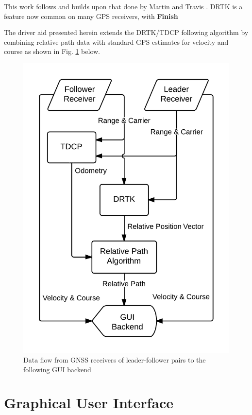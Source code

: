 \documentclass[twocolumn,10pt]{article}
\begin{document}
  This work follows and builds upon that done by Martin \cite{ScottThesis} and Travis \cite{travisdiss}.
  DRTK is a feature now common on many GPS receivers, with \textbf{Finish}
  
  The driver aid presented herein extends the DRTK/TDCP following algorithm by combining relative path data with standard GPS estimates for velocity and course as shown in Fig. \ref{fig:data_flow} below.

  \begin{figure}[ht] \centering
    \includegraphics[width=0.8\columnwidth]{../graphics/data_algo.png}
    \caption{Data flow from GNSS receivers of leader-follower pairs to the following GUI backend}
    \label{fig:data_flow}
  \end{figure}



\section*{Graphical User Interface}
\end{document}
